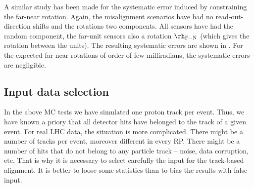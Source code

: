 
A similar study has been made for the systematic error induced by constraining the far-near rotation. Again, the misalignment scenarios have had no read-out-direction shifts and the rotations two components. All sensors have had the random component, the far-unit sensors also a rotation $\rh_{\rm F-N}$ (which gives the rotation between the units). The resulting systematic errors are shown in . For the expected far-near rotations of order of few milliradians, the systematic errors are negligible.



\subsection[al data sel]{Input data selection}

In the above MC tests we have simulated one proton track per event. Thus, we have known a priory that all detector hits have belonged to the track of a given event. For real LHC data, the situation is more complicated. There might be a number of tracks per event, moreover different in every RP. There might be a number of hits that do not belong to any particle track -- noise, data corruption, etc. That is why it is necessary to select carefully the input for the track-based alignment. It is better to loose some statistics than to bias the results with false input.

